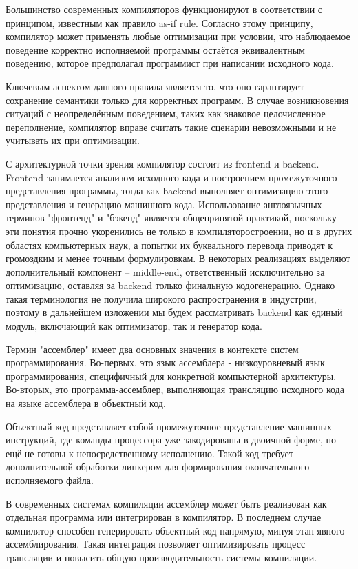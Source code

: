 Большинство современных компиляторов функционируют в соответствии с принципом, известным как правило as-if rule. Согласно этому принципу, компилятор может применять любые оптимизации при условии, что наблюдаемое поведение корректно исполняемой программы остаётся эквивалентным поведению, которое предполагал программист при написании исходного кода.

Ключевым аспектом данного правила является то, что оно гарантирует сохранение семантики только для корректных программ. В случае возникновения ситуаций с неопределённым поведением, таких как знаковое целочисленное переполнение, компилятор вправе считать такие сценарии невозможными и не учитывать их при оптимизации.

С архитектурной точки зрения компилятор состоит из frontend и backend. Frontend занимается анализом исходного кода и построением промежуточного представления программы, тогда как backend выполняет оптимизацию этого представления и генерацию машинного кода. Использование англоязычных терминов "фронтенд" и "бэкенд" является общепринятой практикой, поскольку эти понятия прочно укоренились не только в компиляторостроении, но и в других областях компьютерных наук, а попытки их буквального перевода приводят к громоздким и менее точным формулировкам. В некоторых реализациях выделяют дополнительный компонент -- middle-end, ответственный исключительно за оптимизацию, оставляя за backend только финальную кодогенерацию. Однако такая терминология не получила широкого распространения в индустрии, поэтому в дальнейшем изложении мы будем рассматривать backend как единый модуль, включающий как оптимизатор, так и генератор кода.

Термин "ассемблер" имеет два основных значения в контексте систем программирования. Во-первых, это язык ассемблера - низкоуровневый язык программирования, специфичный для конкретной компьютерной архитектуры. Во-вторых, это программа-ассемблер, выполняющая трансляцию исходного кода на языке ассемблера в объектный код.

Объектный код представляет собой промежуточное представление машинных инструкций, где команды процессора уже закодированы в двоичной форме, но ещё не готовы к непосредственному исполнению. Такой код требует дополнительной обработки линкером для формирования окончательного исполняемого файла.

В современных системах компиляции ассемблер может быть реализован как отдельная программа или интегрирован в компилятор. В последнем случае компилятор способен генерировать объектный код напрямую, минуя этап явного ассемблирования. Такая интеграция позволяет оптимизировать процесс трансляции и повысить общую производительность системы компиляции.

